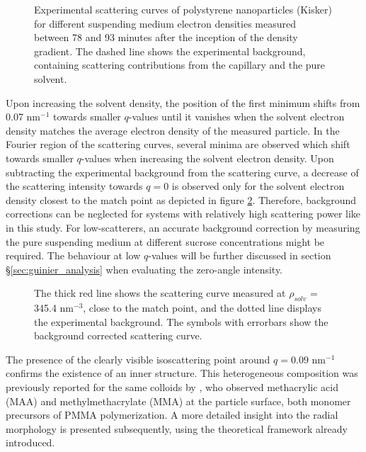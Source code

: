 \begin{figure}%
	\centering
		
		\caption{Experimental scattering curves of polystyrene nanoparticles (Kisker) for different suspending medium electron densities measured between 78 and 93 minutes after the inception of the density gradient. The dashed line shows the experimental background, containing scattering contributions from the capillary and the pure solvent.}
		\label{fig:KiskerContinuousSAXS}
\end{figure}

Upon increasing the solvent density, the position of the first minimum shifts from 0.07 nm\(^{-1}\) towards smaller \(q\)-values until it vanishes when the solvent electron density matches the average electron density of the measured particle. In the Fourier region of the scattering curves, several minima are observed which shift towards smaller \(q\)-values when increasing the solvent electron density. Upon subtracting the experimental background from the scattering curve, a decrease of the scattering intensity towards $q=0$ is observed only for the solvent electron density closest to the match point as depicted in figure \ref{fig:KiskerBackgroundSubtraction}. Therefore, background corrections can be neglected for systems with relatively high scattering power like in this study. For low-scatterers, an accurate background correction by measuring the pure suspending medium at different sucrose concentrations might be required. The behaviour at low $q$-values will be further discussed in section \S\ref{sec:guinier_analysis} when evaluating the zero-angle intensity.

\begin{figure}%
	\centering
		
		\caption{The thick red line shows the scattering curve measured at $\rho_{solv}$ = 345.4 nm$^{-3}$, close to the match point, and the dotted line displays the experimental background. The symbols with errorbars show the background corrected scattering curve.}
		\label{fig:KiskerBackgroundSubtraction}
\end{figure}

The presence of the clearly visible isoscattering point around \(q=0.09\) nm\(^{-1}\) confirms the existence of an inner structure. This heterogeneous composition was previously reported for the same colloids by \citet{minelli_characterization_2014}, who observed methacrylic acid (MAA) and methylmethacrylate (MMA) at the particle surface, both monomer precursors of PMMA polymerization. A more detailed insight into the radial morphology is presented subsequently, using the theoretical framework already introduced.


